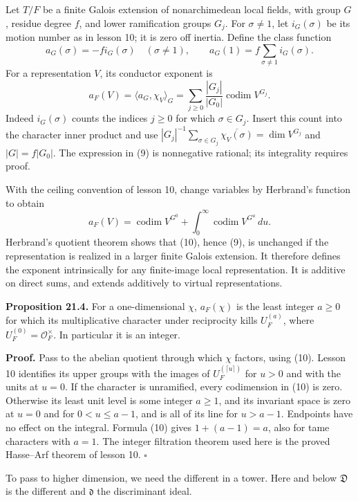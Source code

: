 \documentclass[11pt,a4paper]{article}
\begin{document}
Let \(T/F\) be a finite Galois extension of nonarchimedean local fields,
with group \(G\), residue degree \(f\), and lower ramification groups
\(G_j\). For \(\sigma\ne1\), let \(i_G(\sigma)\) be its motion number as
in lesson 10; it is zero off inertia. Define the class function \[
a_G(\sigma)=-f i_G(\sigma)\quad(\sigma\ne1),\qquad
a_G(1)=f\sum_{\sigma\ne1}i_G(\sigma).
\tag{8}
\] For a representation \(V\), its conductor exponent is \[
a_F(V)=\langle a_G,\chi_V\rangle_G
=\sum_{j\geq0}\frac{|G_j|}{|G_0|}
       \operatorname{codim}V^{G_j}.
\tag{9}
\] Indeed \(i_G(\sigma)\) counts the indices \(j\geq0\) for which
\(\sigma\in G_j\). Insert this count into the character inner product
and use
\(|G_j|^{-1}\sum_{\sigma\in G_j}\overline{\chi_V(\sigma)}=\dim V^{G_j}\)
and \(|G|=f|G_0|\). The expression in (9) is nonnegative rational; its
integrality requires proof.

With the ceiling convention of lesson 10, change variables by Herbrand's
function to obtain \[
a_F(V)=\operatorname{codim}V^{G^0}
       +\int_0^\infty\operatorname{codim}V^{G^u}\,du.
\tag{10}
\] Herbrand's quotient theorem shows that (10), hence (9), is unchanged
if the representation is realized in a larger finite Galois extension.
It therefore defines the exponent intrinsically for any finite-image
local representation. It is additive on direct sums, and extends
additively to virtual representations.

\textbf{Proposition 21.4.} For a one-dimensional \(\chi\), \(a_F(\chi)\)
is the least integer \(a\geq0\) for which its multiplicative character
under reciprocity kills \(U_F^{(a)}\), where
\(U_F^{(0)}=\mathcal O_F^\times\). In particular it is an integer.

\textbf{Proof.} Pass to the abelian quotient through which \(\chi\)
factors, using (10). Lesson 10 identifies its upper groups with the
images of \(U_F^{(\lceil u\rceil)}\) for \(u>0\) and with the units at
\(u=0\). If the character is unramified, every codimension in (10) is
zero. Otherwise its least unit level is some integer \(a\geq1\), and its
invariant space is zero at \(u=0\) and for \(0<u\leq a-1\), and is all
of its line for \(u>a-1\). Endpoints have no effect on the integral.
Formula (10) gives \(1+(a-1)=a\), also for tame characters with \(a=1\).
The integer filtration theorem used here is the proved Hasse--Arf
theorem of lesson 10. \(\square\)

To pass to higher dimension, we need the different in a tower. Here and
below \(\mathfrak D\) is the different and \(\mathfrak d\) the
discriminant ideal.
\end{document}
